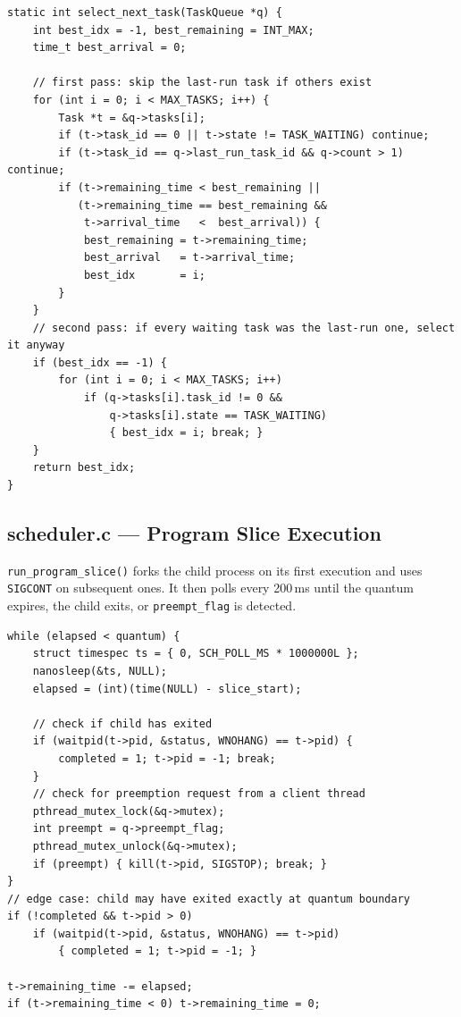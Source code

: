 \documentclass[12pt]{article}
\begin{document}
\begin{lstlisting}[caption={SRJF task selection with no-consecutive rule}]
static int select_next_task(TaskQueue *q) {
    int best_idx = -1, best_remaining = INT_MAX;
    time_t best_arrival = 0;

    // first pass: skip the last-run task if others exist
    for (int i = 0; i < MAX_TASKS; i++) {
        Task *t = &q->tasks[i];
        if (t->task_id == 0 || t->state != TASK_WAITING) continue;
        if (t->task_id == q->last_run_task_id && q->count > 1) continue;
        if (t->remaining_time < best_remaining ||
           (t->remaining_time == best_remaining &&
            t->arrival_time   <  best_arrival)) {
            best_remaining = t->remaining_time;
            best_arrival   = t->arrival_time;
            best_idx       = i;
        }
    }
    // second pass: if every waiting task was the last-run one, select it anyway
    if (best_idx == -1) {
        for (int i = 0; i < MAX_TASKS; i++)
            if (q->tasks[i].task_id != 0 &&
                q->tasks[i].state == TASK_WAITING)
                { best_idx = i; break; }
    }
    return best_idx;
}
\end{lstlisting}

\subsection{scheduler.c --- Program Slice Execution}

\texttt{run\_program\_slice()} forks the child process on its first execution and uses
\texttt{SIGCONT} on subsequent ones. It then polls every 200\,ms until the quantum
expires, the child exits, or \texttt{preempt\_flag} is detected.

\begin{lstlisting}[caption={Polling loop inside run\_program\_slice()}]
while (elapsed < quantum) {
    struct timespec ts = { 0, SCH_POLL_MS * 1000000L };
    nanosleep(&ts, NULL);
    elapsed = (int)(time(NULL) - slice_start);

    // check if child has exited
    if (waitpid(t->pid, &status, WNOHANG) == t->pid) {
        completed = 1; t->pid = -1; break;
    }
    // check for preemption request from a client thread
    pthread_mutex_lock(&q->mutex);
    int preempt = q->preempt_flag;
    pthread_mutex_unlock(&q->mutex);
    if (preempt) { kill(t->pid, SIGSTOP); break; }
}
// edge case: child may have exited exactly at quantum boundary
if (!completed && t->pid > 0)
    if (waitpid(t->pid, &status, WNOHANG) == t->pid)
        { completed = 1; t->pid = -1; }

t->remaining_time -= elapsed;
if (t->remaining_time < 0) t->remaining_time = 0;
\end{lstlisting}
\end{document}
